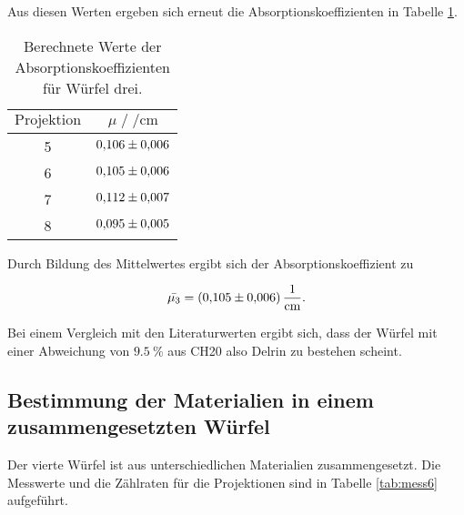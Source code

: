 Aus diesen Werten ergeben sich erneut die Absorptionskoeffizienten in Tabelle \ref{tab:mess5}.

\begin{table}[H]
  \centering
  \caption{Berechnete Werte der Absorptionskoeffizienten für Würfel drei.}
  \label{tab:mess5}
  \begin{tabular}{c c}
  \toprule
  $\text{Projektion}$ & $\mu \;/\; \si{\per\centi\metre}$\\
  \midrule
      5 & $\num{0.106+-0.006}$\\
      6 & $\num{0.105+-0.006}$\\
      7 & $\num{0.112+-0.007}$\\
      8 & $\num{0.095+-0.005}$\\
  \bottomrule
  \end{tabular}
\end{table}

Durch Bildung des Mittelwertes ergibt sich der Absorptionskoeffizient zu 

\begin{equation*}
  \bar{\mu_3} = \SI{0.105+-0.006}{\per\centi\metre}. 
\end{equation*}

Bei einem Vergleich mit den Literaturwerten ergibt sich, dass der Würfel mit einer Abweichung von 
$\SI{9.5}{\percent}$ aus CH20 also Delrin zu bestehen scheint. 

\subsection{Bestimmung der Materialien in einem zusammengesetzten Würfel}

Der vierte Würfel ist aus unterschiedlichen Materialien zusammengesetzt. Die Messwerte und die Zählraten für die Projektionen 
sind in Tabelle \ref{tab:mess6} aufgeführt.

